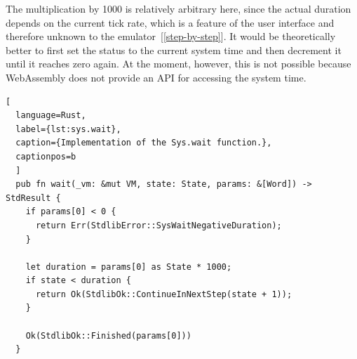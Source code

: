The multiplication by 1000 is relatively arbitrary here, since the actual duration depends on the current tick rate, which is a feature of the user interface and therefore unknown to the emulator~[\ref{step-by-step}].
It would be theoretically better to first set the status to the current system time and then decrement it until it reaches zero again.
At the moment, however, this is not possible because WebAssembly does not provide an API for accessing the system time.
\begin{lstlisting}[
  language=Rust,
  label={lst:sys.wait},
  caption={Implementation of the Sys.wait function.},
  captionpos=b
  ]
  pub fn wait(_vm: &mut VM, state: State, params: &[Word]) -> StdResult {
    if params[0] < 0 {
      return Err(StdlibError::SysWaitNegativeDuration);
    }

    let duration = params[0] as State * 1000;
    if state < duration {
      return Ok(StdlibOk::ContinueInNextStep(state + 1));
    }

    Ok(StdlibOk::Finished(params[0]))
  }
\end{lstlisting}
